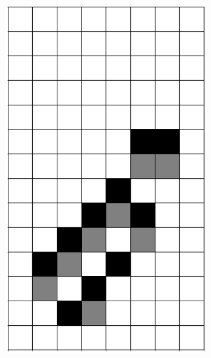\documentclass[12pt]{article}
\numberwithin{figure}{section} %
\begin{document}
\begin{figure}[H]
       \begin{subfigure}{0.19\textwidth}
     \centering
     \includegraphics[width=\linewidth]{Section4/17.0}
     \subcaption{}
   \end{subfigure}
     \begin{subfigure}{0.19\textwidth}
     \centering

\end{subfigure}
\end{figure}
\end{document}
